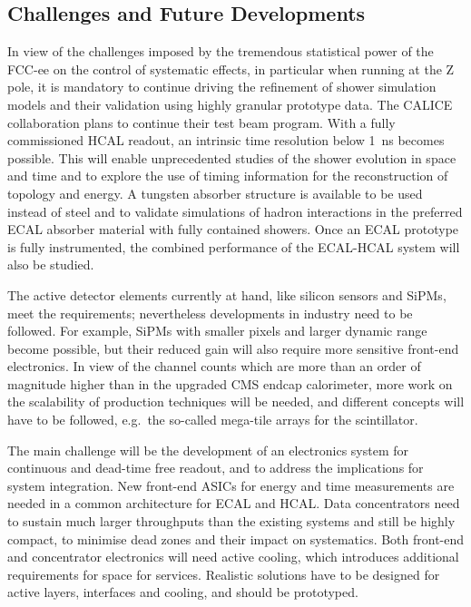 \subsection{Challenges and Future Developments}
In view of the challenges imposed by the tremendous statistical power of the FCC-ee on the control of systematic effects, in particular when running at the Z pole, it is mandatory to continue driving the refinement of shower simulation models and their validation using highly granular prototype data. 
The CALICE collaboration plans to continue their test beam program. 
With a fully commissioned HCAL readout, an intrinsic time resolution below 1~ns becomes possible. This will enable unprecedented studies of the shower evolution in space and time and to  explore the use of timing information for the reconstruction of topology and energy. 
A tungsten absorber structure is available to be used instead of steel and to validate simulations of hadron interactions in the preferred ECAL absorber material with fully contained showers. 
Once an ECAL prototype is fully instrumented, the combined performance of the ECAL-HCAL system will also be studied. 

The active detector elements currently at hand, like silicon sensors and SiPMs, meet the requirements; nevertheless developments in industry need to be followed. 
For example, SiPMs with smaller pixels and larger dynamic range become possible, but their reduced gain will also require more sensitive front-end electronics. 
In view of the channel counts which are more than an order of magnitude higher than in the upgraded CMS endcap calorimeter, more work on the scalability of production techniques will be needed, and different concepts will have to be followed, e.g.\ the so-called mega-tile arrays for the scintillator.   

The main challenge will be the development of an electronics system for continuous and dead-time free readout, and to address the implications for system integration. 
New front-end ASICs for energy and time measurements are needed in a common architecture for ECAL and HCAL. 
Data concentrators need to sustain much larger throughputs than the existing systems and still be highly compact, to minimise  dead zones and their impact on systematics. 
Both front-end and concentrator electronics will need active cooling, which introduces additional requirements for space for services. 
Realistic solutions have to be designed for active layers, interfaces and cooling, and should be prototyped. 

